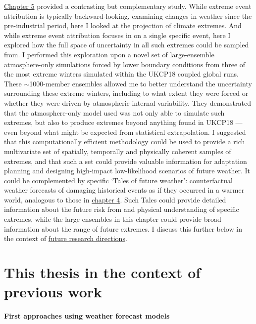   \hyperref[ch5]{Chapter 5} provided a contrasting but complementary study. While extreme event attribution is typically backward-looking, examining changes in weather since the pre-industrial period, here I looked at the projection of climate extremes. And while extreme event attribution focuses in on a single specific event, here I explored how the full space of uncertainty in all such extremes could be sampled from. I performed this exploration upon a novel set of large-ensemble atmosphere-only simulations forced by lower boundary conditions from three of the most extreme winters simulated within the UKCP18 coupled global runs. These $\sim$1000-member ensembles allowed me to better understand the uncertainty surrounding these extreme winters, including to what extent they were forced or whether they were driven by atmospheric internal variability. They demonstrated that the atmosphere-only model used was not only able to simulate such extremes, but also to produce extremes beyond anything found in UKCP18 --- even beyond what might be expected from statistical extrapolation. I suggested that this computationally efficient methodology could be used to provide a rich multivariate set of spatially, temporally and physically coherent samples of extremes, and that such a set could provide valuable information for adaptation planning and designing high-impact low-likelihood scenarios of future weather. It could be complemented by specific `Tales of future weather': counterfactual weather forecasts of damaging historical events as if they occurred in a warmer world, analogous to those in \hyperref[ch4]{chapter 4}. Such Tales could provide detailed information about the future risk from and physical understanding of specific extremes, while the large ensembles in this chapter could provide broad information about the range of future extremes. I discuss this further below in the context of \hyperref[discussion:future]{future research directions}.

\section{This thesis in the context of previous work}\label{discussion:context}

  \paragraph*{First approaches using weather forecast models}

